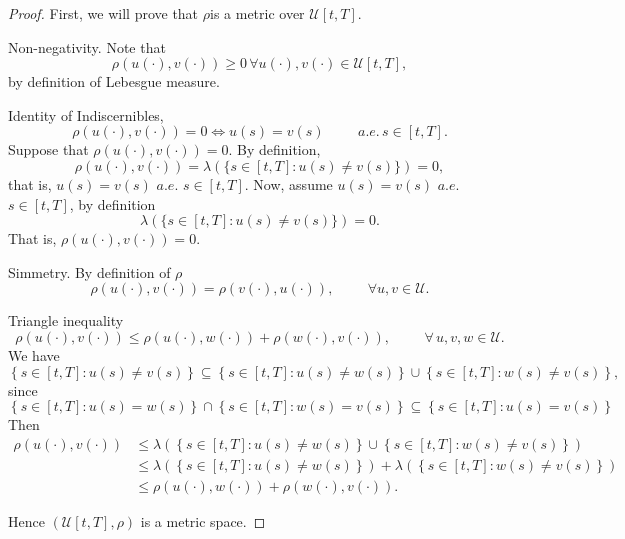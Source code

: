 \begin{proof}
    First, we will prove that $\rho$is a metric over $\mathscr{U}[t,T]$.
    \begin{asparaenum}[i)]
        \item Non-negativity. Note that 
            $$
                \rho(u(\cdot), v(\cdot))\geq 0 \, \forall u(\cdot), v(\cdot) \in \mathscr{U}[t,T],
            $$
            by definition of Lebesgue measure.
        \item Identity of Indiscernibles,
            $$
                \rho(u(\cdot), v(\cdot))=0 \iff  u(s) = v(s) \hspace{1cm} a.e. \, %
                    s \in [t,T].
            $$
            Suppose that $\rho(u(\cdot), v(\cdot))=0 $. By definition,
            $$
                \rho(u(\cdot), v(\cdot)) = \lambda\left(\{s \in [t, T] :  %
            u(s) \neq v(s)\}\right) = 0,
            $$
            that is, $u(s) = v(s)$ $a.e.$ $s \in [t,T]$.
            Now, assume $u(s) = v(s)$ $a.e.$ $s \in [t,T]$, by definition 
            $$
                \lambda\left(\{s \in [t, T] :  u(s) \neq v(s)\} \right)=0.
            $$
            That is, $ \rho(u(\cdot), v(\cdot))=0 $.
        \item Simmetry. By definition of $\rho$
            $$
                \rho(u(\cdot), v(\cdot)) = \rho(v(\cdot), u(\cdot)), \hspace{1cm}%
                    \forall u,v \in \mathscr{U}.
            $$
        \item Triangle inequality
            $$
                \rho(u(\cdot), v(\cdot)) \leq \rho(u(\cdot), w(\cdot)) +    %
                    \rho(w(\cdot), v(\cdot)), \hspace{1cm} \forall \,       %
                    u,v,w \in \mathscr{U}.
            $$
            We have
            $$
                \left\{s\in[t,T] : u(s) \neq v(s)\right\} \subseteq %
                \left\{s\in[t,T] : u(s) \neq w(s)\right\} \cup %
                \left\{s\in[t,T] : w(s) \neq v(s)\right\},
            $$
            since
            $$
                \left\{s\in[t,T] : u(s) = w(s)\right\} \cap %
                \left\{s\in[t,T] : w(s) = v(s)\right\} \subseteq %
                \left\{s\in[t,T] : u(s) = v(s)\right\}
            $$
            Then
            \begin{align*}
                \rho(u(\cdot), v(\cdot)) 
                    &\leq \lambda \left( 
                        \left\{s\in[t,T] : u(s) \neq w(s)\right\}%
                        \cup \left\{s\in[t,T] : w(s) \neq v(s)\right\} %
                    \right) \\
                    &\leq \lambda(\left\{s\in[t,T] : u(s) \neq w(s)\right\}) + %
                        \lambda(\left\{s\in[t,T] : w(s) \neq v(s)\right\}) \\
                    &\leq \rho(u(\cdot), w(\cdot)) + \rho(w(\cdot), v(\cdot)).
            \end{align*}
    \end{asparaenum}
    Hence $(\mathscr{U}[t,T], \rho)$ is a metric space.
\end{proof}
